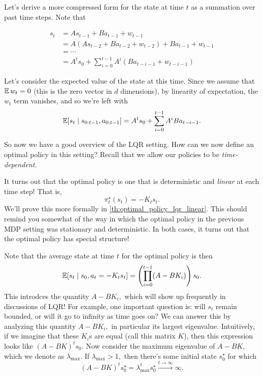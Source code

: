 \documentclass[../main/main]{subfiles}
\begin{document}
Let's derive a more compressed form for the state at time $t$ as a summation
over past time steps. Note that

\begin{align*}
    s_t &= A s_{t-1} + B a_{t-1} + w_{t-1} \\
    &= A (As_{t-2} + B a_{t-2} + w_{t-2}) + B a_{t-1} + w_{t-1} \\
    &= \cdots \\
    &= A^t s_0 + \sum_{i=0}^{t-1} A^i (B a_{t-i-1} + w_{t-i-1})
\end{align*}

Let's consider the expected value of the state at this time.
Since we assume that $\operatorname*{\mathbb{E}} w_t = 0$ (this is the zero vector in $d$ dimensions),
by linearity of expectation, the $w_t$ term vanishes, and so we're left with \[
    \operatorname*{\mathbb{E}} [s_t \mid s_{0:t-1}, a_{0:t-1}] = A^t s_0 + \sum_{i=0}^{t-1} A^i B a_{t-i-1}.
\]

So now we have a good overview of the LQR setting. How can we now define an
optimal policy in this setting? Recall that we allow our policies to be
\emph{time-dependent.}

It turns out that the optimal policy is one that is deterministic and \emph{linear} at each time
step! That is, \[ \pi_t^\star (s_t) = - K_t s_t. \] We'll prove this more
formally in \autoref{th:optimal_policy_lqr_linear}. This should remind you somewhat of the way in which the optimal policy in
the previous MDP setting was stationary and deterministic. In both cases,
it turns out that the optimal policy has special structure!

Note that the average state at time $t$ for the optimal policy is then \[
    \operatorname*{\mathbb{E}} [s_t \mid s_0, a_t = - K_t s_t] = \left( \prod_{i=0}^{t-1} (A - B K_i) \right) s_0.
\]
This introdces the quantity $A - B K_i,$ which will show up frequently in
discussions of LQR!
For example, one important question is: will $s_t$ remain bounded,
or will it go to infinity as time goes on?
We can answer this by analyzing this quantity $A - B K_i,$ in particular its
largest eigenvalue.
Intuitively, if we imagine that these $K_i$s are equal (call this matrix $K$),
then this expression looks like $(A-BK)^t s_0.$
Now consider the maximum eigenvalue of $A - BK,$ which we denote as $\lambda_{\max}.$
If $\lambda_{\max} > 1,$ then there's some initial state $s_0^\star$
for which \[ (A - BK)^t s_0^\star = \lambda_{\max}^t s_0^\star \xrightarrow{t \to \infty} \infty. \]
\end{document}
